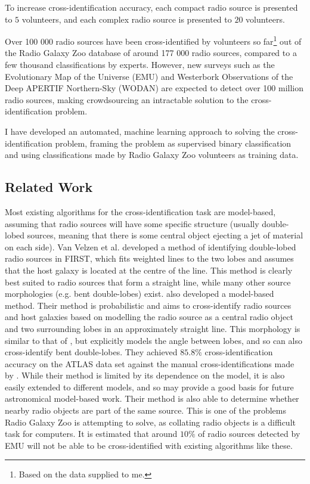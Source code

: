 \documentclass[a4paper]{article}
\begin{document}
      To increase cross-identification accuracy, each compact radio source is presented to $5$ volunteers, and each complex radio source is presented to $20$ volunteers\cite{banfield15}.

      Over 100 000 radio sources have been cross-identified by volunteers so far\footnote{Based on the data supplied to me.} out of the Radio Galaxy Zoo database of around 177 000 radio sources, compared to a few thousand classifications by experts\cite{banfield15}. However, new surveys such as the Evolutionary Map of the Universe (EMU) \cite{norris11} and Westerbork Observations of the Deep APERTIF Northern-Sky (WODAN) \cite{röttgering11} are expected to detect over 100 million radio sources\cite{banfield15}, making crowdsourcing an intractable solution to the cross-identification problem.

      I have developed an automated, machine learning approach to solving the cross-identification problem, framing the problem as supervised binary classification and using classifications made by Radio Galaxy Zoo volunteers as training data.

    \subsection{Related Work}

      Most existing algorithms for the cross-identification task are model-based, assuming that radio sources will have some specific structure (usually double-lobed sources, meaning that there is some central object ejecting a jet of material on each side). Van Velzen et al. \cite{vanvelzen15} developed a method of identifying double-lobed radio sources in FIRST, which fits weighted lines to the two lobes and assumes that the host galaxy is located at the centre of the line. This method is clearly best suited to radio sources that form a straight line, while many other source morphologies (e.g. bent double-lobes) exist. \citet{fan15} also developed a model-based method. Their method is probabilistic and aims to cross-identify radio sources and host galaxies based on modelling the radio source as a central radio object and two surrounding lobes in an approximately straight line. This morphology is similar to that of \citet{vanvelzen15}, but explicitly models the angle between lobes, and so can also cross-identify bent double-lobes. They achieved $85.8\%$ cross-identification accuracy on the ATLAS data set against the manual cross-identifications made by \citet{norris06}. While their method is limited by its dependence on the model, it is also easily extended to different models, and so may provide a good basis for future astronomical model-based work. Their method is also able to determine whether nearby radio objects are part of the same source. This is one of the problems Radio Galaxy Zoo is attempting to solve, as collating radio objects is a difficult task for computers. It is estimated that around $10\%$ of radio sources detected by EMU will not be able to be cross-identified with existing algorithms like these\cite{banfield15,norris11}.
\end{document}
